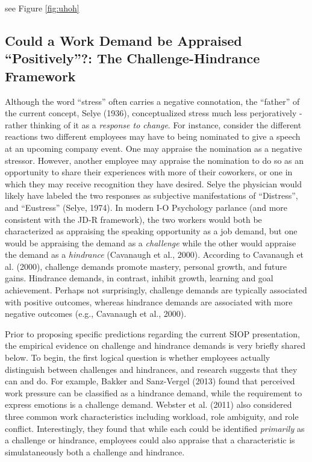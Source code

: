 \documentclass[
  man]{apa6}
\begin{document}
see Figure \ref{fig:uhoh}

\hypertarget{could-a-work-demand-be-appraised-positively-the-challenge-hindrance-framework}{%
\subsection{Could a Work Demand be Appraised ``Positively''?: The Challenge-Hindrance Framework}\label{could-a-work-demand-be-appraised-positively-the-challenge-hindrance-framework}}

Although the word ``stress'' often carries a negative connotation, the ``father'' of the current concept, Selye (1936), conceptualized stress much less perjoratively - rather thinking of it as a \emph{response to change}. For instance, consider the different reactions two different employees may have to being nominated to give a speech at an upcoming company event. One may appraise the nomination as a negative stressor. However, another employee may appraise the nomination to do so as an opportunity to share their experiences with more of their coworkers, or one in which they may receive recognition they have desired. Selye the physician would likely have labeled the two responses as subjective manifestations of ``Distress'', and ``Eustress'' (Selye, 1974). In modern I-O Psychology parlance (and more consistent with the JD-R framework), the two workers would both be characterized as appraising the speaking opportunity as a job demand, but one would be appraising the demand as a \emph{challenge} while the other would appraise the demand as a \emph{hindrance} (Cavanaugh et al., 2000). According to Cavanaugh et al. (2000), challenge demands promote mastery, personal growth, and future gains. Hindrance demands, in contrast, inhibit growth, learning and goal achievement. Perhaps not surprisingly, challenge demands are typically associated with positive outcomes, whereas hindrance demands are associated with more negative outcomes (e.g., Cavanaugh et al., 2000).

Prior to proposing specific predictions regarding the current SIOP presentation, the empirical evidence on challenge and hindrance demands is very briefly shared below. To begin, the first logical question is whether employees actually distinguish between challenges and hindrances, and research suggests that they can and do. For example, Bakker and Sanz-Vergel (2013) found that perceived work pressure can be classified as a hindrance demand, while the requirement to express emotions is a challenge demand. Webster et al. (2011) also considered three common work characteristics including workload, role ambiguity, and role conflict. Interestingly, they found that while each could be identified \emph{primarily} as a challenge or hindrance, employees could also appraise that a characteristic is simulataneously both a challenge and hindrance.
\end{document}
